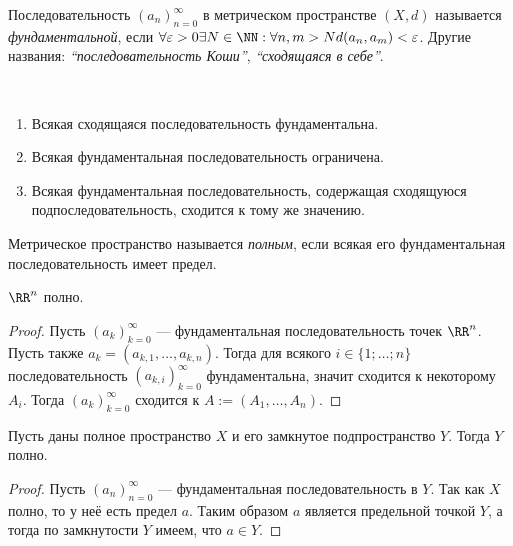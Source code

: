 \documentclass[12pt,a4paper]{article}
\begin{document}
    \begin{definition}
        Последовательность $(a_n)_{n=0}^\infty$ в метрическом пространстве $(X, d)$ называется \emph{фундаментальной}, если $\forall \varepsilon > 0 \exists N \in \NN: \forall n, m > N d(a_n, a_m) < \varepsilon$. Другие названия: \emph{``последовательность Коши''}, \emph{``сходящаяся в себе''}.
    \end{definition}

    \begin{lemma}\ 
        \begin{enumerate}
            \item Всякая сходящаяся последовательность фундаментальна.
            \item Всякая фундаментальная последовательность ограничена.
            \item Всякая фундаментальная последовательность, содержащая сходящуюся подпоследовательность, сходится к тому же значению.
        \end{enumerate}
    \end{lemma}

    \begin{definition}
        Метрическое пространство называется \emph{полным}, если всякая его фундаментальная последовательность имеет предел.
    \end{definition}

    \begin{theorem}
        $\RR^n$ полно.
    \end{theorem}

    \begin{proof}
        Пусть $(a_k)_{k=0}^\infty$ --- фундаментальная последовательность точек $\RR^n$. Пусть также $a_k = (a_{k,1}, \dots, a_{k, n})$. Тогда для всякого $i \in \{1; \dots; n\}$ последовательность $(a_{k,i})_{k=0}^\infty$ фундаментальна, значит сходится к некоторому $A_i$. Тогда $(a_k)_{k=0}^\infty$ сходится к $A := (A_1, \dots, A_n)$.
    \end{proof}

    \begin{theorem}
        Пусть даны полное пространство $X$ и его замкнутое подпространство $Y$. Тогда $Y$ полно.
    \end{theorem}

    \begin{proof}
        Пусть $(a_n)_{n=0}^\infty$ --- фундаментальная последовательность в $Y$. Так как $X$ полно, то у неё есть предел $a$. Таким образом $a$ является предельной точкой $Y$, а тогда по замкнутости $Y$ имеем, что $a \in Y$.
    \end{proof}
\end{document}
